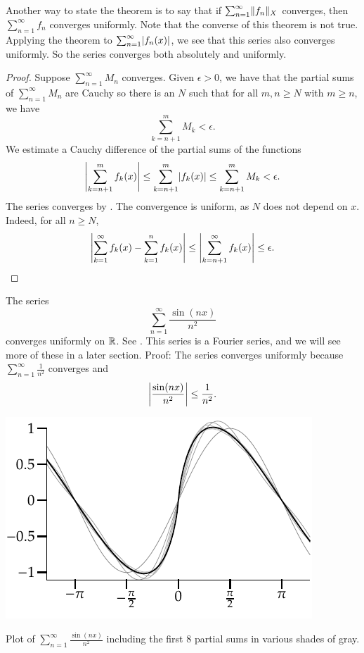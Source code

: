 Another way to state the theorem is to say that if
$\sum_{n=1}^\infty \lVert {f_n} \rVert_X$ converges, then $\sum_{n=1}^\infty f_n$ converges uniformly.
Note that the converse of this theorem is not true.
Applying the theorem to $\sum_{n=1}^\infty \lvert {f_n(x)} \rvert$, we
see that this series also converges uniformly.  So the series converges both absolutely
and uniformly.

\begin{proof}
Suppose $\sum_{n=1}^\infty M_n$ converges.  Given $\epsilon > 0$,
we have that the partial sums of $\sum_{n=1}^\infty M_n$ are Cauchy so
there is an $N$ such that for all $m, n \geq N$ with $m \geq n$, we have
\begin{equation*}
\sum_{k=n+1}^m M_k < \epsilon .
\end{equation*}
We estimate a Cauchy difference of the partial
sums of the functions
\begin{equation*}
\left\lvert {\sum_{k=n+1}^m f_k(x)} \right\rvert \leq
\sum_{k=n+1}^m \lvert {f_k(x)} \rvert \leq
\sum_{k=n+1}^m M_k < \epsilon .
\end{equation*}
The series converges by .
The convergence is uniform, as $N$ does not depend on $x$.
Indeed, for all $n \geq N$,
\begin{equation*}
\left\lvert {\sum_{k=1}^\infty f_k(x) - \sum_{k=1}^n f_k(x)} \right\rvert \leq
\left\lvert {\sum_{k=n+1}^\infty f_k(x)} \right\rvert \leq \epsilon .
\qedhere
\end{equation*}
\end{proof}

\begin{example} \label{example:sinnsqfourier}
The series
\begin{equation*}
\sum_{n=1}^\infty \frac{\sin(nx)}{n^2}
\end{equation*}
converges uniformly on ${\mathbb{R}}$.  See .
This series is a Fourier series, and
we will see more of these in a later section.  Proof:
The series converges uniformly because
$\sum_{n=1}^\infty \frac{1}{n^2}$
converges and
\begin{equation*}
\left\lvert {\frac{\sin(nx)}{n^2}} \right\rvert \leq 
\frac{1}{n^2} .
\end{equation*}
\end{example}

\begin{myfigureht}
\includegraphics{figures/fouriersern2}
\caption{Plot of 
$\sum_{n=1}^\infty \frac{\sin(n x)}{n^2}$ including
the first 8 partial sums in various shades of gray.\label{fig:fouriersern2}}
\end{myfigureht}

